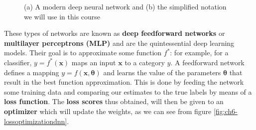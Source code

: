 \begin{figure}[h]
    \hfill
    \hfill
    \hfill
    \caption{(a) A modern deep neural network and (b) the simplified notation we will use in this course}
    \label{fig:ch6-dnnandschema}
\end{figure}

These types of networks are known as \textbf{deep feedforward networks} or \textbf{multilayer perceptrons (MLP)} and are the quintessential deep learning models. Their goal is to approximate some function $f^*$: for example, for a classifier, $y=f^* (\boldsymbol{x})$ maps an input $\boldsymbol{x}$ to a category $y$. A feedforward network defines a mapping $y=f(\boldsymbol{x},\boldsymbol{\theta})$ and learns the value of the parameters $\boldsymbol{\theta}$ that result in the best function approximation. This is done by feeding the network some training data and comparing our estimates to the true labels by means of a \textbf{loss function}. The \textbf{loss scores} thus obtained, will then be given to an \textbf{optimizer} which will update the weights, as we can see from figure \ref{fig:ch6-lossoptimizationdnn}.


